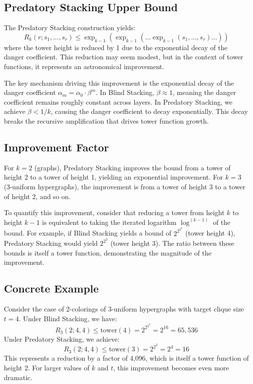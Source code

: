 \documentclass[12pt]{article}
\begin{document}
\subsection{Predatory Stacking Upper Bound}
The Predatory Stacking construction yields:
\begin{equation}
R_k(r; s_1, \ldots, s_r) \leq \exp_{k-1}(\exp_{k-1}(\ldots \exp_{k-1}(s_1, \ldots, s_r) \ldots))
\end{equation}
where the tower height is reduced by 1 due to the exponential decay of the danger coefficient. This reduction may seem modest, but in the context of tower functions, it represents an astronomical improvement.

The key mechanism driving this improvement is the exponential decay of the danger coefficient $\alpha_m = \alpha_0 \cdot \beta^m$. In Blind Stacking, $\beta \approx 1$, meaning the danger coefficient remains roughly constant across layers. In Predatory Stacking, we achieve $\beta < 1/k$, causing the danger coefficient to decay exponentially. This decay breaks the recursive amplification that drives tower function growth.

\subsection{Improvement Factor}
For $k=2$ (graphs), Predatory Stacking improves the bound from a tower of height 2 to a tower of height 1, yielding an exponential improvement. For $k=3$ (3-uniform hypergraphs), the improvement is from a tower of height 3 to a tower of height 2, and so on.

To quantify this improvement, consider that reducing a tower from height $k$ to height $k-1$ is equivalent to taking the iterated logarithm $\log^{(k-1)}$ of the bound. For example, if Blind Stacking yields a bound of $2^{2^{2^{2}}}$ (tower height 4), Predatory Stacking would yield $2^{2^{2}}$ (tower height 3). The ratio between these bounds is itself a tower function, demonstrating the magnitude of the improvement.

\subsection{Concrete Example}
Consider the case of 2-colorings of 3-uniform hypergraphs with target clique size $t=4$. Under Blind Stacking, we have:
\begin{equation}
R_3(2; 4, 4) \leq \text{tower}(4) = 2^{2^{2^{2}}} = 2^{16} = 65,536
\end{equation}
Under Predatory Stacking, we achieve:
\begin{equation}
R_3(2; 4, 4) \leq \text{tower}(3) = 2^{2^{2}} = 2^{4} = 16
\end{equation}
This represents a reduction by a factor of 4,096, which is itself a tower function of height 2. For larger values of $k$ and $t$, this improvement becomes even more dramatic.
\end{document}
